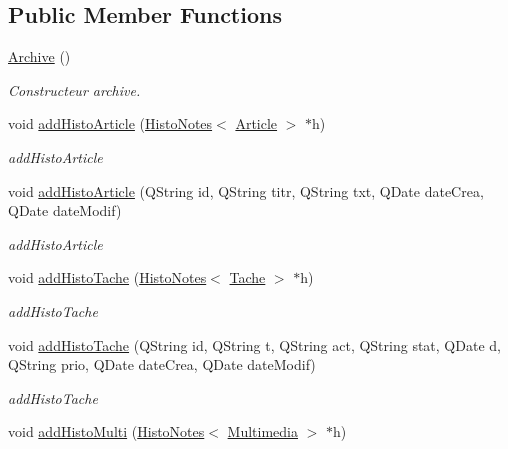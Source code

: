 \subsection*{Public Member Functions}
\begin{DoxyCompactItemize}
\item 
\mbox{\label{class_archive_a4a2c0b86f5a65108d2355e652f627200}} 
\hyperlink{class_archive_a4a2c0b86f5a65108d2355e652f627200}{Archive} ()
\begin{DoxyCompactList}\small\item\em Constructeur archive. \end{DoxyCompactList}\item 
void \hyperlink{class_archive_a5f62010e4c8dc87cf56c5cda92be2c94}{add\+Histo\+Article} (\hyperlink{class_histo_notes}{Histo\+Notes}$<$ \hyperlink{class_article}{Article} $>$ $\ast$h)
\begin{DoxyCompactList}\small\item\em add\+Histo\+Article \end{DoxyCompactList}\item 
void \hyperlink{class_archive_a9ec3f6c9a61ec302c9c5d3a13db58400}{add\+Histo\+Article} (Q\+String id, Q\+String titr, Q\+String txt, Q\+Date date\+Crea, Q\+Date date\+Modif)
\begin{DoxyCompactList}\small\item\em add\+Histo\+Article \end{DoxyCompactList}\item 
void \hyperlink{class_archive_aabb712928d7b93ed425ebc33e821936f}{add\+Histo\+Tache} (\hyperlink{class_histo_notes}{Histo\+Notes}$<$ \hyperlink{class_tache}{Tache} $>$ $\ast$h)
\begin{DoxyCompactList}\small\item\em add\+Histo\+Tache \end{DoxyCompactList}\item 
void \hyperlink{class_archive_a2440247a1156b6042afc1ff1ae6d004f}{add\+Histo\+Tache} (Q\+String id, Q\+String t, Q\+String act, Q\+String stat, Q\+Date d, Q\+String prio, Q\+Date date\+Crea, Q\+Date date\+Modif)
\begin{DoxyCompactList}\small\item\em add\+Histo\+Tache \end{DoxyCompactList}\item 
void \hyperlink{class_archive_a5653d94a8628b0a898d80d15811001c9}{add\+Histo\+Multi} (\hyperlink{class_histo_notes}{Histo\+Notes}$<$ \hyperlink{class_multimedia}{Multimedia} $>$ $\ast$h)

\end{DoxyCompactItemize}
